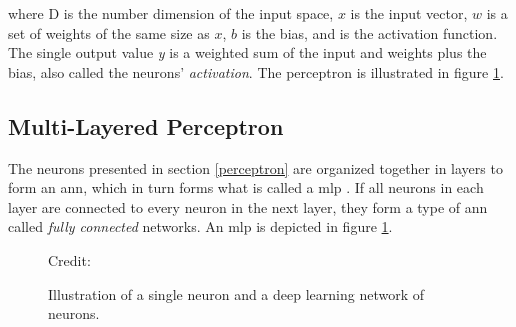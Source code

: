         where D is the number dimension of the input space, $x$ is the input vector, $w$ is a set of weights of the same size as $x$, $b$ is the bias, and {\textsigma} is the activation function. The single output value \textit{y} is a weighted sum of the input and weights plus the bias, also called the neurons' \textit{activation}. The perceptron is illustrated in figure \ref{Perceptron / MLP}.
    
    \subsection{Multi-Layered Perceptron} \label{MLP}
        The neurons presented in section \ref{perceptron} are organized together in layers to form an \gls{ann}, which in turn forms what is called a \gls{mlp} \cite{razavi2021deep_exp_per}. If all neurons in each layer are connected to every neuron in the next layer, they form a type of \gls{ann} called \textit{fully connected} networks. An \gls{mlp} is depicted in figure \ref{Perceptron / MLP}.
        
            \begin{figure}[H]
                \centering
                
        	
                
                \caption[The perceptron and multi-layer perceptron]{Illustration of a single neuron and a deep learning network of neurons.}
              	\medskip 
                \hspace*{15pt}\hbox{\scriptsize Credit: \citeauthor{razavi2021deep_exp_per}\cite{razavi2021deep_exp_per}}
                \label{Perceptron / MLP}
            \end{figure}
        
